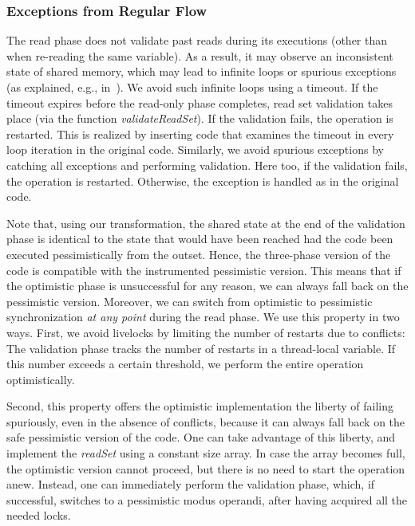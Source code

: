 \subsubsection{Exceptions from Regular Flow}
\label{sssec:alg-abnormal}


The read phase does not validate past reads during its executions (other than when re-reading the same variable). 
As a result, it may observe an inconsistent state of shared memory, which may lead to infinite loops or spurious exceptions (as explained, e.g., in~\cite{HLR:SLCA2010}).
%
We avoid such infinite loops using a timeout.
If the timeout expires before the read-only phase completes, read set
validation takes place (via the function \emph{validateReadSet}). If the validation fails, the operation is restarted.
This is realized by inserting code that examines the timeout in every loop iteration in the original code.
%
Similarly, we avoid spurious exceptions by catching all exceptions and
performing validation. Here too, if the validation fails, the operation is restarted. Otherwise, the exception is handled as in
the original code.


Note that, using our transformation, the shared state at the end of the validation phase
is identical to the state that would have been reached had the code been executed pessimistically from
the outset. Hence, the three-phase version of the code is compatible with the instrumented
pessimistic version. This means that if the optimistic phase is unsuccessful for any reason, we can always
fall back on the pessimistic version. Moreover, we can switch from optimistic to pessimistic synchronization
\emph{at any point} during the read phase.
We use this property in two ways.
First, we avoid livelocks by limiting the number of restarts due to conflicts:
The validation phase tracks the number of restarts in a thread-local variable.
If this number exceeds a certain threshold, we perform the entire operation optimistically.

Second, this property offers the optimistic implementation the liberty of
failing spuriously, even in the absence of conflicts, because it can always fall back on the safe pessimistic version
of the code.
One can take advantage of this liberty, and implement the \emph{readSet} using a constant size array.
In case the array becomes full,  the optimistic version cannot proceed, but there is no 
need to start the operation anew.
Instead, one can immediately perform the validation phase, which, if successful, switches to a pessimistic modus operandi, after having acquired all the needed locks.
